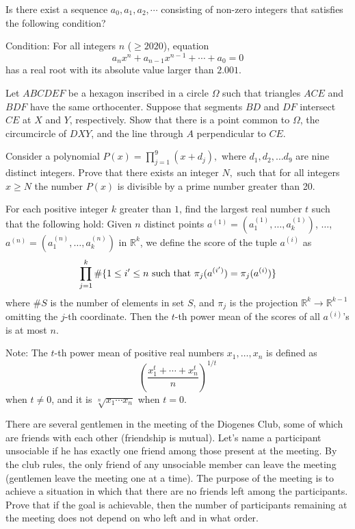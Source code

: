 \documentclass[11pt]{scrartcl}
\begin{document}
\begin{problem}[637496989440645]
Is there exist a sequence $a_0,a_1,a_2,\cdots $ consisting of non-zero integers that satisfies the following condition?

Condition: For all integers $n$ ($\ge 2020$), equation
$$a_n x^n+a_{n-1}x^{n-1}+\cdots +a_0=0$$has a real root with its absolute value larger than $2.001$.
\end{problem}
\begin{problem}[639126468624733]
Let $ABCDEF$ be a hexagon inscribed in a circle $\Omega$ such that triangles $ACE$ and $BDF$ have the same orthocenter. Suppose that segments $BD$ and $DF$ intersect $CE$ at $X$ and $Y$, respectively. Show that there is a point common to $\Omega$, the circumcircle of $DXY$, and the line through $A$ perpendicular to $CE$.
\end{problem}
\begin{problem}[643666520789113]
	Consider a polynomial $P(x) =  \prod^9_{j=1}(x+d_j),$ where $d_1, d_2, \ldots d_9$ are nine distinct integers. Prove that there exists an integer $N,$ such that for all integers $x \geq N$ the number $P(x)$ is divisible by a prime number greater than 20.
\end{problem}
\begin{problem}[644698320031727]
For each positive integer $k$ greater than $1$, find the largest real number $t$ such that the following hold:
Given $n$ distinct points $a^{(1)}=(a^{(1)}_1,\ldots, a^{(1)}_k)$, $\ldots$, $a^{(n)}=(a^{(n)}_1,\ldots, a^{(n)}_k)$ in $\mathbb{R}^k$, we define the score of the tuple $a^{(i)}$ as
\[\prod_{j=1}^{k}\#\{1\leq i'\leq n\textup{ such that }\pi_j(a^{(i')})=\pi_j(a^{(i)})\}\]where $\#S$ is the number of elements in set $S$, and $\pi_j$ is the projection $\mathbb{R}^k\to \mathbb{R}^{k-1}$ omitting the $j$-th coordinate. Then the $t$-th power mean of the scores of all $a^{(i)}$'s is at most $n$.

Note: The $t$-th power mean of positive real numbers $x_1,\ldots,x_n$ is defined as
\[\left(\frac{x_1^t+\cdots+x_n^t}{n}\right)^{1/t}\]when $t\neq 0$, and it is $\sqrt[n]{x_1\cdots x_n}$ when $t=0$.
\end{problem}
\begin{problem}[645068477920006]
There are several gentlemen in the meeting of the Diogenes Club, some of which are friends with each other (friendship is mutual). Let's name a participant unsociable if he has exactly one friend among those present at the meeting. By the club rules, the only friend of any unsociable member can leave the meeting (gentlemen leave the meeting one at a time). The purpose of the meeting is to achieve a situation in which that there are no friends left among the participants. Prove that if the goal is achievable, then the number of participants remaining at the meeting does not depend on who left and in what order.
\end{problem}
\end{document}
